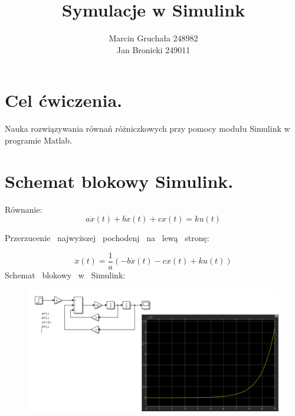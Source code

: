 \documentclass{article}
\title{Symulacje w Simulink}
\author{Marcin Gruchała 248982\\
Jan Bronicki 249011\\}
\date{}
\begin{document}
\maketitle
\section{Cel ćwiczenia.}
Nauka rozwiązywania równań różniczkowych przy pomocy modułu Simulink w programie Matlab.  
\section{Schemat blokowy Simulink.}
Równanie:
$$
 a\ddot{x}(t)+b\dot{x}(t)+cx(t)=ku(t)
$$
\begin{flushleft}
    Przerzucenie \ najwyższej \ pochodenj \ na \ lewą \ stronę:
\end{flushleft}
$$
\ddot{x}(t)=\frac{1}{a}(-b\dot{x}(t)-cx(t)+ku(t))
$$
Schemat \ blokowy \ w \ Simulink:
\begin{figure}[h!]
    \centering
    \includegraphics[width=1\textwidth]{./Screeny/uklad.png}
    \label{fig:my_label}
\end{figure}

\newpage
\end{document}
